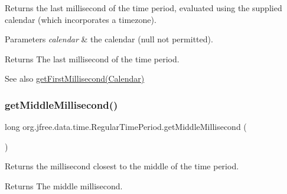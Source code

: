 Returns the last millisecond of the time period, evaluated using the supplied calendar (which incorporates a timezone).


\begin{DoxyParams}{Parameters}
{\em calendar} & the calendar ({\ttfamily null} not permitted).\\
\hline
\end{DoxyParams}
\begin{DoxyReturn}{Returns}
The last millisecond of the time period.
\end{DoxyReturn}
\begin{DoxySeeAlso}{See also}
\mbox{\hyperlink{classorg_1_1jfree_1_1data_1_1time_1_1_regular_time_period_a673bf019570d5e38eea9787c8e0ce42a}{get\+First\+Millisecond(\+Calendar)}} 
\end{DoxySeeAlso}
\mbox{\label{classorg_1_1jfree_1_1data_1_1time_1_1_regular_time_period_a2c54501dfc21d9ded93cc251344db863}} 
\subsubsection{\texorpdfstring{get\+Middle\+Millisecond()}{getMiddleMillisecond()}\hspace{0.1cm}{\footnotesize\ttfamily [1/3]}}
{\footnotesize\ttfamily long org.\+jfree.\+data.\+time.\+Regular\+Time\+Period.\+get\+Middle\+Millisecond (\begin{DoxyParamCaption}{ }\end{DoxyParamCaption})}

Returns the millisecond closest to the middle of the time period.

\begin{DoxyReturn}{Returns}
The middle millisecond. 
\end{DoxyReturn}
\mbox{\label{classorg_1_1jfree_1_1data_1_1time_1_1_regular_time_period_a5ccb28f4990a31f2c6cd6c4e98f9ae26}} 
